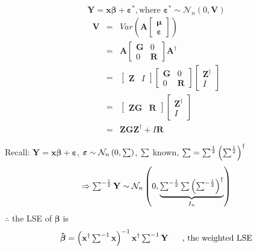 \documentclass{article}
\begin{document}
\begin{equation*}
\mathbf{Y}=\mathbf{x\beta }+\mathbf{\varepsilon }^{\ast }\mathbf{,}\text{
where }\mathbf{\varepsilon }^{\ast }\sim \mathcal{N}_{n}\left( 0,\mathbf{V}%
\right) 
\end{equation*}%
\begin{eqnarray*}
\mathbf{V} &=&Var\left( \mathbf{A}\left[ 
\begin{array}{c}
\mathbf{\mu } \\ 
\mathbf{\varepsilon }%
\end{array}%
\right] \right)  \\
&=&\mathbf{A}\left[ 
\begin{array}{cc}
\mathbf{G} & 0 \\ 
0 & \mathbf{R}%
\end{array}%
\right] \mathbf{A}^{\dagger } \\
&=&\left[ 
\begin{array}{cc}
\mathbf{Z} & I%
\end{array}%
\right] \left[ 
\begin{array}{cc}
\mathbf{G} & 0 \\ 
0 & \mathbf{R}%
\end{array}%
\right] \left[ 
\begin{array}{c}
\mathbf{Z}^{\dagger } \\ 
I%
\end{array}%
\right]  \\
&=&\left[ 
\begin{array}{cc}
\mathbf{ZG} & \mathbf{R}%
\end{array}%
\right] \left[ 
\begin{array}{c}
\mathbf{Z}^{\dagger } \\ 
I%
\end{array}%
\right]  \\
&=&\mathbf{ZGZ}^{\dagger }+I\mathbf{R}
\end{eqnarray*}

\bigskip

Recall: $\mathbf{Y}=\mathbf{x\beta }+\mathbf{\varepsilon }$, $\mathbf{%
\varepsilon }\sim \mathcal{N}_{n}\left( 0,\tsum \right) $, $\mathop{\textstyle \sum } $ known, $%
\tsum =\tsum^{\frac{1}{2}}\left( \tsum^{\frac{1}{2}}\right) ^{\dagger }$%
\begin{equation*}
\Rightarrow \tsum\nolimits^{-\frac{1}{2}}\mathbf{Y}\sim \mathcal{N}%
_{n}\left( 0,\underset{I_{n}}{\underbrace{\tsum\nolimits^{-\frac{1}{2}}\tsum
\left( \tsum\nolimits^{-\frac{1}{2}}\right) ^{\dagger }}}\right)
\end{equation*}%
\newline
$\therefore $ the LSE of $\mathbf{\beta }$ is%
\begin{equation*}
\mathbf{\hat{\beta}}=\left( \mathbf{x}^{\dagger }\tsum\nolimits^{-1}\mathbf{x%
}\right) ^{-1}\mathbf{x}^{\dagger }\tsum\nolimits^{-1}\mathbf{Y\quad }\text{%
, the weighted LSE}
\end{equation*}
\end{document}
